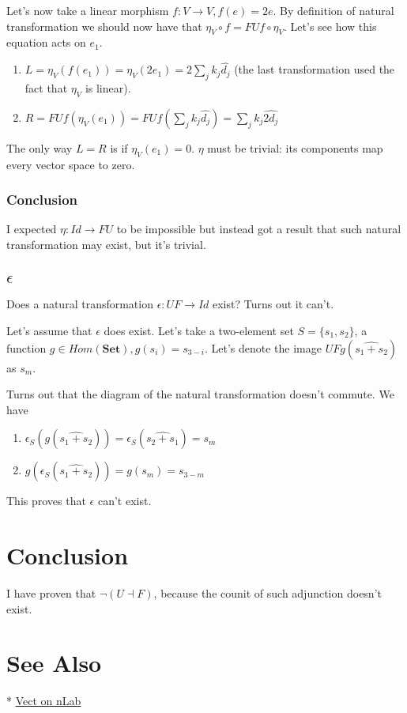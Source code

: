 \documentclass[12pt]{article}
\newcommand{\Set}{\mathbf{Set}}
\begin{document}
Let's now take a linear morphism $f: V \rightarrow V, f(e) = 2e$.
By definition of natural transformation we should now have that $\eta_V \circ f
= FUf \circ \eta_V$. Let's see how this equation acts on $e_1$.

\begin{enumerate}
  \item $L = \eta_V(f(e_1)) = \eta_V(2e_1) = 2\sum_j k_{j} \hat{d_{j}}$ (the last transformation used the fact that $\eta_V$ is linear).
  \item $R = FUf(\eta_V(e_1)) = FUf\left(\sum_j k_{j} \hat{d_{j}}\right)
      = \sum_j k_{j} \widehat{2d_{j}}$
\end{enumerate}

The only way $L = R$ is if $\eta_V(e_1) = 0$. $\eta$ must be trivial: its components map every
vector space to zero.

\subsubsection{Conclusion}

I expected $\eta: Id \rightarrow FU$ to be impossible but instead got a result
that such natural transformation may exist, but it's trivial.

\subsection{$\epsilon$}

Does a natural transformation $\epsilon: UF \rightarrow Id$ exist? Turns out it can't.

Let's assume that $\epsilon$ does exist.
Let's take a two-element set $S = \{s_1, s_2\}$, a function $g \in Hom(\Set), g(s_i) = s_{3-i}$.
Let's denote the image $UFg(\widehat{s_1 + s_2})$ as $s_m$.


Turns out that the diagram of the natural transformation doesn't commute. We have

\begin{enumerate}
  \item $\epsilon_S(g(\widehat{s_1 + s_2})) = \epsilon_S(\widehat{s_2 + s_1}) = s_m$
  \item $g(\epsilon_S(\widehat{s_1 + s_2})) = g(s_m) = s_{3-m}$
\end{enumerate}

This proves that $\epsilon$ can't exist.

\section{Conclusion}

I have proven that $\lnot (U \dashv F)$, because the counit of such adjunction doesn't exist.

\section{See Also}

* \href{https://ncatlab.org/nlab/show/Vect}{Vect on nLab}
\end{document}
